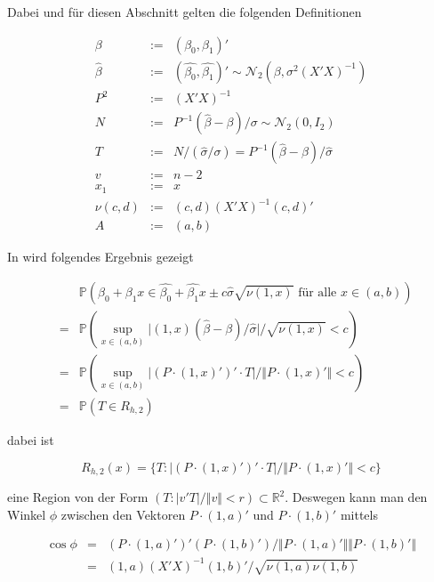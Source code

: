 \documentclass[12pt,a4paper]{article}
\theoremstyle{definition}
\theoremstyle{definition}
\theoremstyle{definition}
\theoremstyle{definition}
\begin{document}
Dabei und für diesen Abschnitt gelten die folgenden Definitionen

\begin{eqnarray*}
\beta &:=& (\beta_0, \beta_1)' \\
\hat{\beta} &:=& (\hat{\beta_0}, \hat{\beta_1})' \sim \mathscr{N}_2(\beta, \sigma^2 (X'X)^{-1}) \\
P^2 &:=& (X'X)^{-1} \\
N &:=& P^{-1} (\hat{\beta} - \beta)/\sigma \sim \mathscr{N}_{2}(0,I_2) \\
T &:=& N / (\hat{\sigma} / \sigma) = P^{-1} (\hat{\beta}-\beta) / \hat{\sigma} \\
v &:=& n-2 \\
x_1 &:=& x \\
\nu(c,d) &:=& (c,d) (X'X)^{-1} (c,d)' \\
A &:=& (a,b)
\end{eqnarray*}

In \cite[19-20]{Liu64} wird folgendes Ergebnis gezeigt

\begin{eqnarray*}
&& \mathbb{P} \left( \beta_0 + \beta_1 x \in \hat{\beta_0} + \hat{\beta_1} x \pm c \hat{\sigma} \sqrt{\nu(1,x)}  \text{ für alle } x \in (a,b) \right)  \\
&=& \mathbb{P} \left( \sup_{x \in (a,b)} \vert (1,x) ( \hat{\beta} - \beta ) / \hat{\sigma} \vert / \sqrt{\nu(1,x)} < c \right) \\
&=& \mathbb{P} \left( \sup_{x \in (a,b)} \vert (P \cdot (1,x)')' \cdot T \vert / \Vert P \cdot (1,x)' \Vert < c \right) \\
&=& \mathbb{P} \left( T \in R_{h,2} \right)
\end{eqnarray*}

dabei ist

\begin{equation*}
R_{h,2}(x) = \{ T : \vert (P \cdot (1,x)' )' \cdot T \vert / \Vert P \cdot (1,x)' \Vert < c \}
\end{equation*}

eine Region von der Form $(T : \vert v'T \vert / \Vert v \Vert < r) \subset \mathbb{R}^2$. Deswegen kann man den Winkel $\phi$ zwischen den Vektoren $P \cdot (1,a)'$ und $P \cdot (1,b)'$ mittels

\begin{eqnarray*}
\cos \phi &=& (P \cdot (1,a)')' (P \cdot (1,b)') / \Vert P \cdot (1,a)' \Vert \Vert P \cdot (1,b)' \Vert \\
&=& (1,a) (X'X)^{-1} (1,b)' / \sqrt{\nu(1,a) \nu(1,b)} 
\end{eqnarray*}
\end{document}
